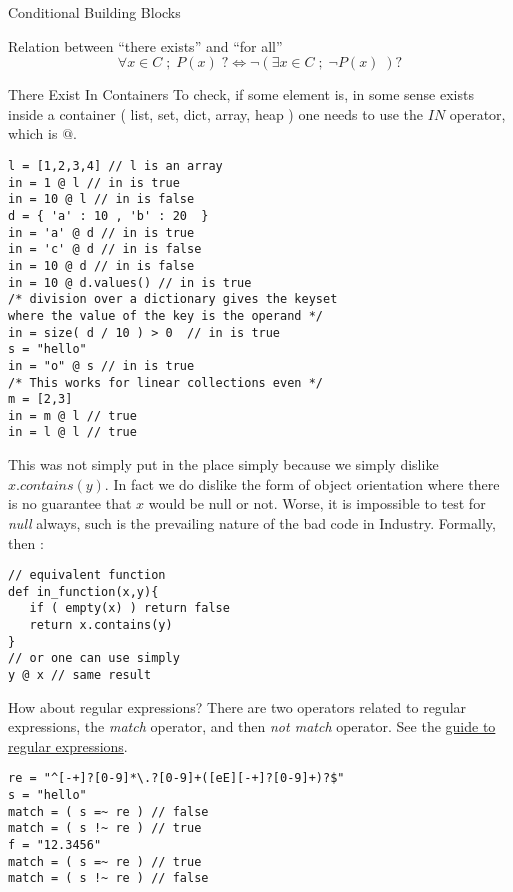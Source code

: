 \begin{section}{Conditional Building Blocks}
\begin{subsection}{Relation between ``there exists'' and ``for all'' }
$$
\forall x \in C \; ; \; P(x) \; ? \Longleftrightarrow \neg ( \exists x \in C \; ; \; \neg P(x) \; ) ?
$$
\end{subsection}

\begin{subsection}{There Exist In Containers}
To check, if some element is, in some sense exists inside a container ( list, set, dict, array, heap )
one needs to use the $IN$ operator, which is $@$. 
\begin{center}\begin{minipage}{\linewidth}
\begin{lstlisting}[style=JexlStyle]
l = [1,2,3,4] // l is an array 
in = 1 @ l // in is true 
in = 10 @ l // in is false 
d = { 'a' : 10 , 'b' : 20  }
in = 'a' @ d // in is true 
in = 'c' @ d // in is false 
in = 10 @ d // in is false 
in = 10 @ d.values() // in is true 
/* division over a dictionary gives the keyset 
where the value of the key is the operand */
in = size( d / 10 ) > 0  // in is true 
s = "hello"
in = "o" @ s // in is true 
/* This works for linear collections even */
m = [2,3]
in = m @ l // true 
in = l @ l // true  
\end{lstlisting}
\end{minipage}\end{center}

This was not simply put in the place simply because we simply dislike $x.contains(y)$. 
In fact we do dislike the form of object orientation where there is no guarantee that $x$ would be null or not.
Worse, it is impossible to test for \emph{null} always, such is the prevailing nature of the bad code in Industry. 
Formally, then :

\begin{lstlisting}[style=JexlStyle]
// equivalent function 
def in_function(x,y){
   if ( empty(x) ) return false 
   return x.contains(y) 
}
// or one can use simply 
y @ x // same result
\end{lstlisting}

How about regular expressions? There are two operators related to regular expressions,
the \emph{match} operator, and then \emph{not match} operator. 
See the \href{http://www.regular-expressions.info/quickstart.html}{guide to regular expressions}.

\begin{center}\begin{minipage}{\linewidth}
\begin{lstlisting}[style=JexlStyle]
re = "^[-+]?[0-9]*\.?[0-9]+([eE][-+]?[0-9]+)?$"
s = "hello"
match = ( s =~ re ) // false 
match = ( s !~ re ) // true 
f = "12.3456"
match = ( s =~ re ) // true 
match = ( s !~ re ) // false 
\end{lstlisting}
\end{minipage}\end{center}


\end{subsection}
\end{section}
